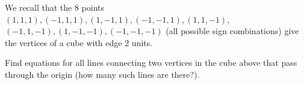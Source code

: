  We recall that the 8 points $(1,1,1), (-1,1,1), (1,-1,1), (-1,-1,1), (1,1,-1)$, $(-1,1,-1), (1,-1,-1), (-1,-1,-1)$ (all possible sign combinations) give the vertices of a cube with edge 2 units.
 
 Find equations for all lines connecting two vertices in the cube above that pass through the origin (how many such lines are there?).